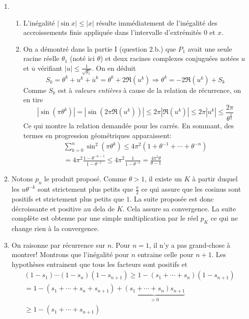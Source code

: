 \begin{enumerate}
 \item
\begin{enumerate}
 \item L'inégalité $|\sin x| \leq |x|$ résulte immédiatement de l'inégalité des accroissements finis appliquée dans l'intervalle d'extrémités $0$ et $x$.
 \item On a démontré dans la partie I (question 2.b.) que $P_1$ avait une seule racine réelle $\theta_1$ (noté ici $\theta$) et deux racines complexes conjuguées notées $u$ et $\overline{u}$ vérifiant $|u|\leq \frac{1}{\sqrt{\theta_1}}$. On en déduit
\begin{displaymath}
 S_k = \theta^k + u^k + \overline{u}^k = \theta^k + 2\Re(u^k)
\Rightarrow
\theta^k = -2\Re(u^k) +S_k
\end{displaymath}
Comme $S_k$ est à \emph{valeurs entières} à cause de la relation de récurrence, on en tire
\begin{displaymath}
 |\sin(\pi \theta^k)|= |\sin\left( 2\pi\Re(u^k)\right) |\leq 2\pi |\Re(u^k)|\leq 2\pi |u^k|\leq \frac{2\pi}{\theta^{\frac{k}{2}}}
\end{displaymath}
Ce qui montre la relation demandée pour les carrés. En sommant, des termes en progression géométriques apparaissent:
\begin{multline*}
 \sum_{k=0}^{n}\sin^2(\pi \theta^k)
\leq 4\pi^2\left(1+\theta^{-1}+\cdots+ \theta^{-n}\right)\\
= 4\pi^2\frac{1-\theta^{-n-1}}{1-\theta^{-1}}
\leq  4\pi^2\frac{1}{1-\theta^{-1}}= \frac{4\pi^2 \theta}{\theta-1} 
\end{multline*}
\end{enumerate}

 \item Notons $p_n$ le produit proposé. Comme $\theta>1$, il existe un $K$ à partir duquel les $u\theta^{-k}$ sont strictement plus petits que $\frac{\pi}{2}$ ce qui assure que les cosinus sont positifs et strictement plus petits que $1$. La suite proposée est donc décroissante et positive au dela de $K$. Cela assure sa convergence. La suite complète est obtenue par une simple multiplication par le réel $p_K$ ce qui ne change rien à la convergence.

 \item On raisonne par récurrence sur $n$. Pour $n=1$, il n'y a pas grand-chose à montrer! Montrons que l'inégalité pour $n$ entraine celle pour $n+1$. Les hypothèses entrainent que tous les facteurs sont positifs et
\begin{multline*}
 (1-s_1)\cdots(1-s_n)(1-s_{n+1})
\geq 1-\left(s_1+\cdots+s_n \right) (1-s_{n+1})\\
= 1-\left(s_1+\cdots+s_n +s_{n+1}\right)+\underset{>0}{\underbrace{\left(s_1+\cdots+s_n \right)s_{n+1}}}\\
\geq 1-\left(s_1 + \cdots +s_{n+1}\right)
\end{multline*}


\end{enumerate}
